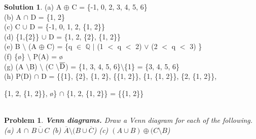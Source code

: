 \documentclass{article}
\newtheorem{problem}{Problem}
\theoremstyle{definition}
\newtheorem*{solution}{Solution}
\begin{document}
\begin{solution}

(a) A \(\oplus\) C = \{-1, 0, 2, 3, 4, 5, 6\}\\

(b) A \(\cap\) D = \{1, 2\}\\

(c)  C \(\cup\) D = \{-1, 0, 1, 2, \{1, 2\}\}\\

(d) \{1,\{2\}\} \(\cup\) D = \{1, 2, \{2\}, \{1, 2\}\}\\

(e) B \(\setminus\) (A \(\oplus\) C) = \{q \(\in\) \(\mathbb{Q}\) \(|\) (1 \(<\) q \(<\) 2) \(\vee\) (2 \(<\) q \(<\) 3) \}\\

(f)  \{\o\} \(\setminus\) P(A) = \o\\

(g) (A \(\setminus\)B) \(\setminus\) (C \(\setminus\)\(\overline{\rm D}\)) = \{1, 3, 4, 5, 6\}\(\setminus\)\{1\} = \{3, 4, 5, 6\}\\

(h) P(D) \(\cap\) D = \{\{1\}, \{2\}, \{1, 2\}, \{\{1, 2\}\}, \{1, \{1, 2\}\}, \{2, \{1, 2\}\},

\{1, 2, \{1, 2\}\}, \o\} \(\cap\) \{1, 2, \{1, 2\}\} = \{\{1, 2\}\}\\\\

\end{solution}


\begin{problem}
\textbf{Venn diagrams.} Draw a Venn diagram for each of the following.\\

(a) A \(\cap\) \(\overline{B \cup C}\) \: (b) \(\overline{A} \setminus (B \cup \overline{C}\)) \: (c) \(( A \cup B) \oplus ( C \setminus B\))\\\\

\end{problem}
\end{document}

